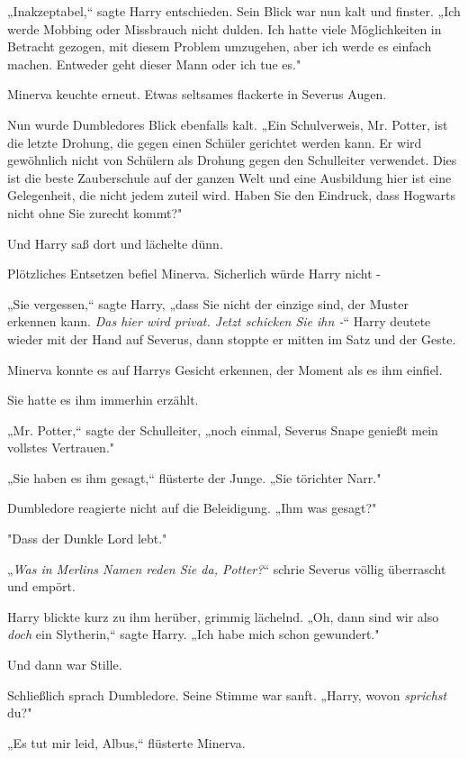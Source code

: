 {„Inakzeptabel,“ sagte Harry entschieden. Sein Blick war nun kalt und finster. „Ich werde Mobbing oder Missbrauch nicht dulden. Ich hatte viele Möglichkeiten in Betracht gezogen, mit diesem Problem umzugehen, aber ich werde es einfach machen. Entweder geht dieser Mann oder ich tue es."

Minerva keuchte erneut. Etwas seltsames flackerte in Severus Augen.

Nun wurde Dumbledores Blick ebenfalls kalt. „Ein Schulverweis, Mr. Potter, ist die letzte Drohung, die gegen einen Schüler gerichtet werden kann. Er wird gewöhnlich nicht von Schülern als Drohung gegen den Schulleiter verwendet. Dies ist die beste Zauberschule auf der ganzen Welt und eine Ausbildung hier ist eine Gelegenheit, die nicht jedem zuteil wird. Haben Sie den Eindruck, dass Hogwarts nicht ohne Sie zurecht kommt?"

Und Harry saß dort und lächelte dünn.

Plötzliches Entsetzen befiel Minerva. Sicherlich würde Harry nicht -

„Sie vergessen,“ sagte Harry, „dass Sie nicht der einzige sind, der Muster erkennen kann. \emph{Das hier wird privat. Jetzt schicken Sie ihn -}“ Harry deutete wieder mit der Hand auf Severus, dann stoppte er mitten im Satz und der Geste.

Minerva konnte es auf Harrys Gesicht erkennen, der Moment als es ihm einfiel.

Sie hatte es ihm immerhin erzählt.

„Mr. Potter,“ sagte der Schulleiter, „noch einmal, Severus Snape genießt mein vollstes Vertrauen."

„Sie haben es ihm gesagt,“ flüsterte der Junge. „Sie törichter Narr."

Dumbledore reagierte nicht auf die Beleidigung. „Ihm was gesagt?"

"Dass der Dunkle Lord lebt."

„\emph{Was in Merlins Namen reden Sie da, Potter?}“ schrie Severus völlig überrascht und empört.

Harry blickte kurz zu ihm herüber, grimmig lächelnd. „Oh, dann sind wir also \emph{doch} ein Slytherin,“ sagte Harry. „Ich habe mich schon gewundert."

Und dann war Stille.

Schließlich sprach Dumbledore. Seine Stimme war sanft. „Harry, wovon \emph{sprichst} du?"

„Es tut mir leid, Albus,“ flüsterte Minerva.

}
